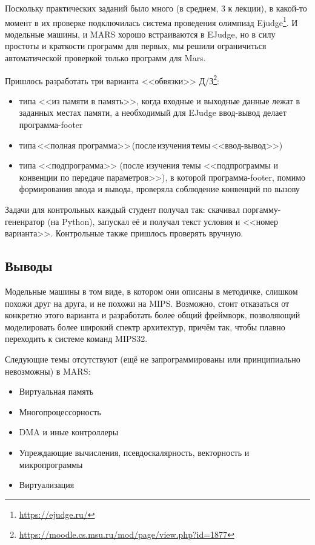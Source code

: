 \documentclass[10pt, a5paper]{article}
\begin{document}
Поскольку практических заданий было много (в среднем, 3 к лекции), в какой-то момент в их проверке подключилась система проведения олимпиад Ejudge\footnote{\url{https://ejudge.ru/}}. И модельные машины, и MARS хорошо встраиваются в EJudge, но в силу простоты и краткости программ для первых, мы решили ограничиться автоматической проверкой только программ для Mars.

Пришлось разработать три варианта <<обвязки>> Д/З\footnote{\url{https://moodle.cs.msu.ru/mod/page/view.php?id=1877}}:

\begin{itemize}
  \item типа <<из памяти в память>>, когда входные и выходные данные лежат в заданных местах памяти, а необходимый для EJudge ввод-вывод делает программа-footer
  \item типа\,<<полная программа>>\,(после\,изучения\,темы\,<<ввод-вывод>>)
  \item типа <<подпрограмма>> (после изучения темы <<подпрограммы и конвенции по передаче параметров>>), в которой программа-footer, помимо формирования ввода и вывода, проверяла соблюдение конвенций по вызову
\end{itemize}

Задачи для контрольных каждый студент получал так: скачивал поргамму-гененратор (на Python), запускал её и получал текст условия и <<номер варианта>>. Контрольные также пришлось проверять вручную.

\subsection*{Выводы}

Модельные машины в том виде, в котором они описаны в методичке, слишком похожи друг на друга, и не похожи на MIPS. Возможно, стоит отказаться от конкретно этого варианта и разработать более общий фреймворк, позволяющий моделировать более широкий спектр архитектур, причём так, чтобы плавно переходить к системе команд MIPS32.

Следующие темы отсутствуют (ещё не запрограммированы или принципиально невозможны) в MARS:

\begin{itemize}
  \item Виртуальная память
  \item Многопроцессорность
  \item DMA и иные контроллеры
  \item Упреждающие вычисления, псевдоскалярность, векторность и микропрограммы
  \item Виртуализация
\end{itemize}
\end{document}

